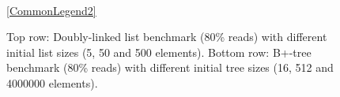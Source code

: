 \begin{figure}
\begin{tikzpicture}




\end{tikzpicture}
\\

\ref{CommonLegend2}
\caption{Top row: Doubly-linked list benchmark (80\% reads) with different initial list sizes (5, 50 and 500 elements). Bottom row: B+-tree benchmark (80\% reads) with different initial tree sizes (16, 512 and 4000000 elements).}
\label{fig:dll}
\end{figure}

	
        
    

